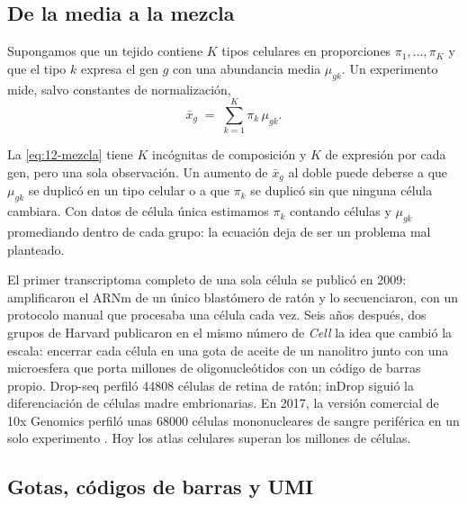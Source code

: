 \subsection{De la media a la mezcla}

Supongamos que un tejido contiene $K$ tipos celulares en proporciones $\pi_1,\dots,\pi_K$ y que el tipo $k$ expresa el gen $g$ con una abundancia media $\mu_{gk}$. Un experimento  mide, salvo constantes de normalización,
\begin{equation}\label{eq:12-mezcla}
\bar{x}_g \;=\; \sum_{k=1}^{K} \pi_k\,\mu_{gk}.
\end{equation}
\begin{simbolos}
\end{simbolos}
La \cref{eq:12-mezcla} tiene $K$ incógnitas de composición y $K$ de expresión por cada gen, pero una sola observación. Un aumento de $\bar{x}_g$ al doble puede deberse a que $\mu_{gk}$ se duplicó en un tipo celular o a que $\pi_k$ se duplicó sin que ninguna célula cambiara. Con datos de célula única estimamos $\pi_k$ contando células y $\mu_{gk}$ promediando dentro de cada grupo: la ecuación deja de ser un problema mal planteado.

\begin{historia}
El primer transcriptoma completo de una sola célula se publicó en 2009: \textcite{c12-tang2009} amplificaron el ARNm de un único blastómero de ratón y lo secuenciaron, con un protocolo manual que procesaba una célula cada vez. Seis años después, dos grupos de Harvard publicaron en el mismo número de \emph{Cell} la idea que cambió la escala: encerrar cada célula en una gota de aceite de un nanolitro junto con una microesfera que porta millones de oligonucleótidos con un código de barras propio. Drop-seq \parencite{c12-macosko2015} perfiló \num{44808} células de retina de ratón; inDrop \parencite{c12-klein2015} siguió la diferenciación de células madre embrionarias. En 2017, la versión comercial de 10x Genomics perfiló unas \num{68000} células mononucleares de sangre periférica en un solo experimento \parencite{c12-zheng2017}. Hoy los atlas celulares superan los millones de células.
\end{historia}

\subsection{Gotas, códigos de barras y UMI}

